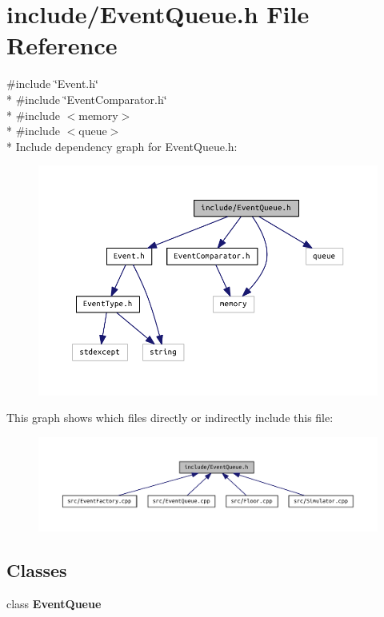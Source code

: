 \section{include/\+Event\+Queue.h File Reference}
\label{_event_queue_8h}
{\ttfamily \#include \char`\"{}Event.\+h\char`\"{}}\\*
{\ttfamily \#include \char`\"{}Event\+Comparator.\+h\char`\"{}}\\*
{\ttfamily \#include $<$memory$>$}\\*
{\ttfamily \#include $<$queue$>$}\\*
Include dependency graph for Event\+Queue.\+h\+:\nopagebreak
\begin{figure}[H]
\begin{center}
\leavevmode
\includegraphics[width=350pt]{_event_queue_8h__incl}
\end{center}
\end{figure}
This graph shows which files directly or indirectly include this file\+:\nopagebreak
\begin{figure}[H]
\begin{center}
\leavevmode
\includegraphics[width=350pt]{_event_queue_8h__dep__incl}
\end{center}
\end{figure}
\subsection*{Classes}
\begin{DoxyCompactItemize}
\item 
class {\bf Event\+Queue}
\end{DoxyCompactItemize}
